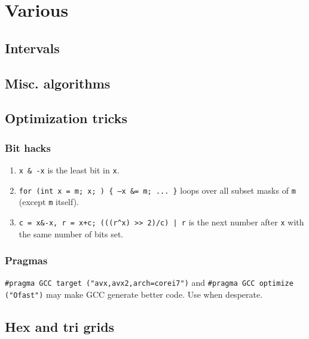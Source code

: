 
\chapter{Various}

	\section{Intervals}

	\section{Misc. algorithms}

	\section{Optimization tricks}
		\subsection{Bit hacks}
			\begin{enumerate}
			\item \texttt{x \& -x} is the least bit in \texttt{x}.
			\item \texttt{for (int x = m; x; ) \{ --x \&= m; ... \}} loops over all subset masks of \texttt{m} (except \texttt{m} itself).
			\item \texttt{c = x\&-x, r = x+c; (((r\^{}x) >> 2)/c) | r} is the next number after \texttt{x} with the same number of bits set.
			\end{enumerate}
		\subsection{Pragmas}
			\lstinline{#pragma GCC target ("avx,avx2,arch=corei7")} and \lstinline{#pragma GCC optimize ("Ofast")} may make GCC generate better code. Use when desperate.

	\section{Hex and tri grids}
